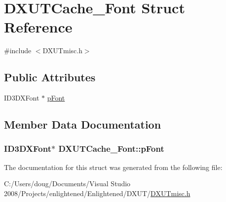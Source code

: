 \hypertarget{struct_d_x_u_t_cache___font}{
\section{DXUTCache\_\-Font Struct Reference}
\label{struct_d_x_u_t_cache___font}
}


{\ttfamily \#include $<$DXUTmisc.h$>$}\subsection*{Public Attributes}
\begin{DoxyCompactItemize}
\item 
ID3DXFont $\ast$ \hyperlink{struct_d_x_u_t_cache___font_a248189d7049578ebe1a0ce37d516cac9}{pFont}
\end{DoxyCompactItemize}


\subsection{Member Data Documentation}
\hypertarget{struct_d_x_u_t_cache___font_a248189d7049578ebe1a0ce37d516cac9}{
\subsubsection[{pFont}]{\setlength{\rightskip}{0pt plus 5cm}ID3DXFont$\ast$ {\bf DXUTCache\_\-Font::pFont}}}
\label{struct_d_x_u_t_cache___font_a248189d7049578ebe1a0ce37d516cac9}


The documentation for this struct was generated from the following file:\begin{DoxyCompactItemize}
\item 
C:/Users/doug/Documents/Visual Studio 2008/Projects/enlightened/Enlightened/DXUT/\hyperlink{_d_x_u_tmisc_8h}{DXUTmisc.h}\end{DoxyCompactItemize}
